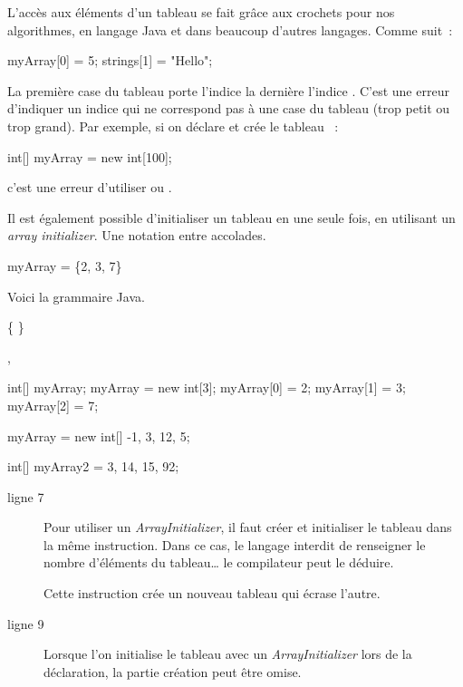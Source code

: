 	L'accès aux éléments d'un tableau se fait grâce aux crochets
	 pour nos algorithmes, en langage Java et dans beaucoup
	d'autres langages. Comme suit~:

	\begin{java}
		myArray[0] = 5;
		strings[1] = "Hello";
	\end{java}

	La première case du tableau porte l’indice 
	la dernière l’indice .  C’est une erreur
	d’indiquer un indice qui ne correspond pas à une case du tableau (trop petit
	ou trop grand).  Par exemple, si on déclare et crée le tableau ~:

	\begin{java}
int[] myArray = new int[100];
	\end{java}
	c'est une erreur d’utiliser  ou . 

	Il est également possible d'initialiser un tableau en une seule fois, en 
	utilisant un \textit{array initializer}. Une notation entre accolades. 

	\begin{langagenaturel}
myArray = \{2, 3, 7\}
	\end{langagenaturel}

	Voici la grammaire Java. 

	\begin{grammaire}
		    \{ \grammarrule{[VariableInitializerList]} \}

		     \grammarrule{[}, \grammarrule{Expression ]} 
	\end{grammaire}

	\begin{java}
		int[] myArray;
		myArray = new int[3];
		myArray[0] = 2;
		myArray[1] = 3;
		myArray[2] = 7;

		myArray = new int[] {-1, 3, 12, 5};

		int[] myArray2 = {3, 14, 15, 92};
		
	\end{java}

	\begin{description}

		\item[ligne 7] Pour utiliser un \textit{ArrayInitializer}, il faut créer
			et initialiser le tableau dans la même instruction. Dans ce cas, le
			langage interdit de renseigner le nombre d'éléments du tableau… le
			compilateur peut le déduire.

			Cette instruction crée un nouveau tableau qui écrase l'autre. 

		\item[ligne 9] Lorsque l'on initialise le tableau avec un
			\textit{ArrayInitializer} lors de la déclaration, la partie création
			peut être omise.
	
	\end{description}

